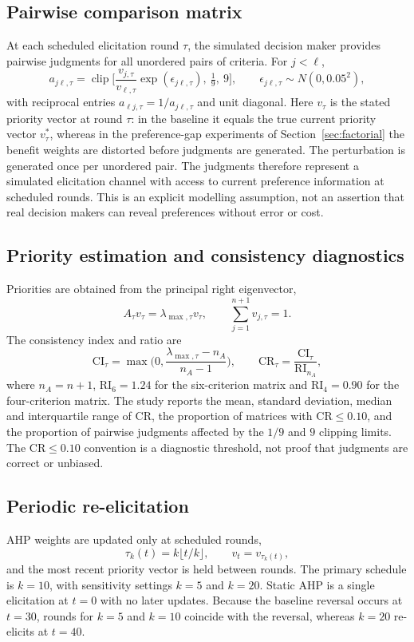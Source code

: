 \documentclass[12pt,a4paper]{article}
\begin{document}
\subsection{Pairwise comparison matrix}
At each scheduled elicitation round $\tau$, the simulated decision maker provides pairwise judgments for all unordered pairs of criteria. For $j<\ell$,
\begin{equation}a_{j\ell,\tau}=\operatorname{clip}\Big[\frac{v_{j,\tau}}{v_{\ell,\tau}}\exp(\epsilon_{j\ell,\tau}),\ \tfrac19,\ 9\Big],\qquad \epsilon_{j\ell,\tau}\sim N(0,0.05^2),\end{equation}
with reciprocal entries $a_{\ell j,\tau}=1/a_{j\ell,\tau}$ and unit diagonal. Here $v_\tau$ is the stated priority vector at round $\tau$: in the baseline it equals the true current priority vector $v^*_\tau$, whereas in the preference-gap experiments of Section~\ref{sec:factorial} the benefit weights are distorted before judgments are generated. The perturbation is generated once per unordered pair. The judgments therefore represent a simulated elicitation channel with access to current preference information at scheduled rounds. This is an explicit modelling assumption, not an assertion that real decision makers can reveal preferences without error or cost.

\subsection{Priority estimation and consistency diagnostics}
Priorities are obtained from the principal right eigenvector,
\begin{equation}A_\tau v_\tau=\lambda_{\max,\tau}v_\tau,\qquad\sum_{j=1}^{n+1}v_{j,\tau}=1.\end{equation}
The consistency index and ratio are
\begin{equation}\mathrm{CI}_\tau=\max\Big(0,\frac{\lambda_{\max,\tau}-n_A}{n_A-1}\Big),\qquad \mathrm{CR}_\tau=\frac{\mathrm{CI}_\tau}{\mathrm{RI}_{n_A}},\end{equation}
where $n_A=n+1$, $\mathrm{RI}_6=1.24$ for the six-criterion matrix and $\mathrm{RI}_4=0.90$ for the four-criterion matrix. The study reports the mean, standard deviation, median and interquartile range of CR, the proportion of matrices with $\mathrm{CR}\le0.10$, and the proportion of pairwise judgments affected by the $1/9$ and $9$ clipping limits. The $\mathrm{CR}\le0.10$ convention is a diagnostic threshold, not proof that judgments are correct or unbiased.

\subsection{Periodic re-elicitation}
AHP weights are updated only at scheduled rounds,
\begin{equation}\tau_k(t)=k\lfloor t/k\rfloor,\qquad v_t=v_{\tau_k(t)},\end{equation}
and the most recent priority vector is held between rounds. The primary schedule is $k=10$, with sensitivity settings $k=5$ and $k=20$. Static AHP is a single elicitation at $t=0$ with no later updates. Because the baseline reversal occurs at $t=30$, rounds for $k=5$ and $k=10$ coincide with the reversal, whereas $k=20$ re-elicits at $t=40$.
\end{document}
